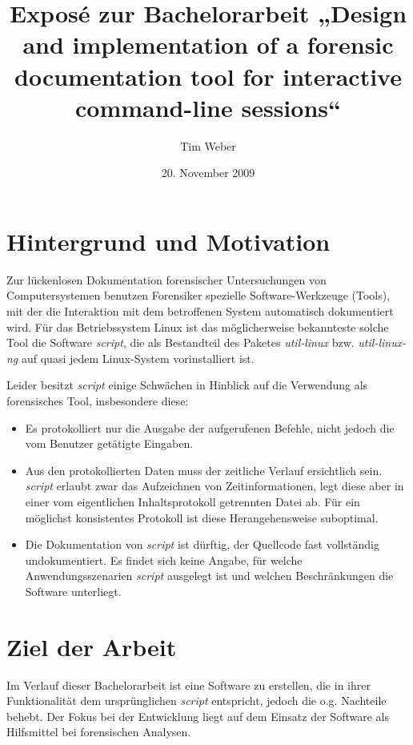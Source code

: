 \documentclass{scrartcl}
\author{Tim Weber}
\date{20. November 2009}
\title{Exposé zur Bachelorarbeit „Design and implementation of a forensic documentation tool for interactive command-line sessions“}
\begin{document}
\maketitle

\section*{Hintergrund und Motivation}
Zur lückenlosen Dokumentation forensischer Untersuchungen von Computersystemen benutzen Forensiker spezielle Software-Werkzeuge (Tools), mit der die Interaktion mit dem betroffenen System automatisch dokumentiert wird.
Für das Betriebssystem Linux ist das möglicherweise bekannteste solche Tool die Software \emph{script}, die als Bestandteil des Paketes \emph{util-linux} bzw. \emph{util-linux-ng} auf quasi jedem Linux-System vorinstalliert ist.

Leider besitzt \emph{script} einige Schwächen in Hinblick auf die Verwendung als forensisches Tool, insbesondere diese:
\begin{itemize}
\item Es protokolliert nur die Ausgabe der aufgerufenen Befehle, nicht jedoch die vom Benutzer getätigte Eingaben.
\item Aus den protokollierten Daten muss der zeitliche Verlauf ersichtlich sein. \emph{script} erlaubt zwar das Aufzeichnen von Zeitinformationen, legt diese aber in einer vom eigentlichen Inhaltsprotokoll getrennten Datei ab. Für ein möglichst konsistentes Protokoll ist diese Herangehensweise suboptimal.
\item Die Dokumentation von \emph{script} ist dürftig, der Quellcode fast vollständig undokumentiert. Es findet sich keine Angabe, für welche Anwendungsszenarien \emph{script} ausgelegt ist und welchen Beschränkungen die Software unterliegt.
\end{itemize}

\section*{Ziel der Arbeit}
Im Verlauf dieser Bachelorarbeit ist eine Software zu erstellen, die in ihrer Funktionalität dem ursprünglichen \emph{script} entspricht, jedoch die o.g. Nachteile behebt.
Der Fokus bei der Entwicklung liegt auf dem Einsatz der Software als Hilfsmittel bei forensischen Analysen.
\end{document}
